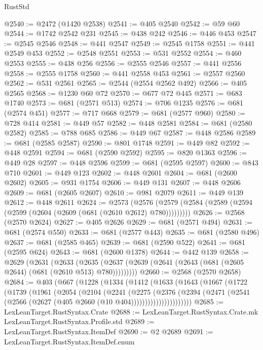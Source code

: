 \begin{lexlean}{RustStd}
\begin{coremodule}
@2540 := @2472 (@1420 @2538)
@2541 := @405 @2540
@2542 := @59 @60
@2544 := @1742 @2542 @231
@2545 := @438 @242
@2546 := @446 @453
@2547 := @2545 @2546
@2548 := @441 @2547
@2549 := @2545 @1758
@2551 := @441 @2549 @453
@2552 := @2548 @2551
@2553 := @531 @2552
@2554 := @460 @2553
@2555 := @438 @256
@2556 := @2555 @2546
@2557 := @441 @2556
@2558 := @2555 @1758
@2560 := @441 @2558 @453
@2561 := @2557 @2560
@2562 := @531 @2561
@2565 := @2544 (@2554 @2562 @492)
@2566 := @405 @2565
@2568 := @1230 @60 @72
@2570 := @677 @72 @445
@2571 := @683 @1740
@2573 := @681 (@2571 @513)
@2574 := @706 @1235
@2576 := @681 (@2574 @451)
@2577 := @717 @668
@2579 := @681 (@2577 @960)
@2580 := @728 @414
@2581 := @449 @57
@2582 := @448 @2581
@2584 := @681 (@2580 @2582)
@2585 := @788 @685
@2586 := @449 @67
@2587 := @448 @2586
@2589 := @681 (@2585 @2587)
@2590 := @801 @1748
@2591 := @449 @82
@2592 := @448 @2591
@2594 := @681 (@2590 @2592)
@2595 := @820 @1363
@2596 := @449 @28
@2597 := @448 @2596
@2599 := @681 (@2595 @2597)
@2600 := @843 @710
@2601 := @449 @123
@2602 := @448 @2601
@2604 := @681 (@2600 @2602)
@2605 := @931 @1754
@2606 := @449 @131
@2607 := @448 @2606
@2609 := @681 (@2605 @2607)
@2610 := @981 @2079
@2611 := @449 @139
@2612 := @448 @2611
@2624 := @2573
    (@2576 (@2579 (@2584 (@2589 (@2594 (@2599 (@2604 (@2609 (@681 (@2610 @2612) @780)))))))))
@2626 := @2568 (@2570 @2624)
@2627 := @405 @2626
@2629 := @681 (@2571 @494)
@2631 := @681 (@2574 @550)
@2633 := @681 (@2577 @443)
@2635 := @681 (@2580 @496)
@2637 := @681 (@2585 @465)
@2639 := @681 (@2590 @522)
@2641 := @681 (@2595 @624)
@2643 := @681 (@2600 @1378)
@2644 := @442 @139
@2658 := @2629
    (@2631
      (@2633 (@2635 (@2637 (@2639 (@2641 (@2643 (@681 (@2605 @2644) (@681 (@2610 @513) @780)))))))))
@2660 := @2568 (@2570 @2658)
@2684 := @403
    (@667
      (@1228
        (@1334
          (@1412
            (@1633
              (@1643
                (@1667
                  (@1722
                    (@1739
                      (@1961
                        (@2054
                          (@2104
                            (@2241
                              (@2275
                                (@2376
                                  (@2394
                                    (@2471
                                      (@2541
                                        (@2566 (@2627 (@405 @2660 (@10 @404))))))))))))))))))))))
@2685 := LexLeanTarget.RustSyntax.Crate
@2688 := LexLeanTarget.RustSyntax.Crate.mk LexLeanTarget.RustSyntax.Profile.std
@2689 := LexLeanTarget.RustSyntax.ItemDef
@2690 := @2 @2689
@2691 := LexLeanTarget.RustSyntax.ItemDef.enum

\end{coremodule}
\end{lexlean}
